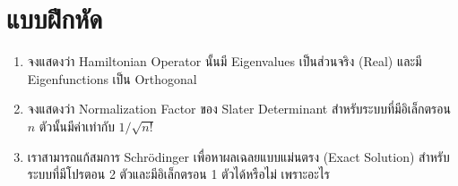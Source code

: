\section{แบบฝึกหัด}

\begin{enumerate}[topsep=0pt,noitemsep]
  \setlength\itemsep{1em}
  \item จงแสดงว่า Hamiltonian Operator นั้นมี Eigenvalues เป็นส่วนจริง (Real) และมี Eigenfunctions เป็น Orthogonal

  \item จงแสดงว่า Normalization Factor ของ Slater Determinant สำหรับระบบที่มีอิเล็กตรอน $n$ ตัวนั้นมีค่าเท่ากับ $1 / \sqrt{n!}$

  \item เราสามารถแก้สมการ Schr\"{o}dinger เพื่อหาผลเฉลยแบบแม่นตรง (Exact Solution) สำหรับระบบที่มีโปรตอน 2 ตัวและมีอิเล็กตรอน
        1 ตัวได้หรือไม่ เพราะอะไร
\end{enumerate}
